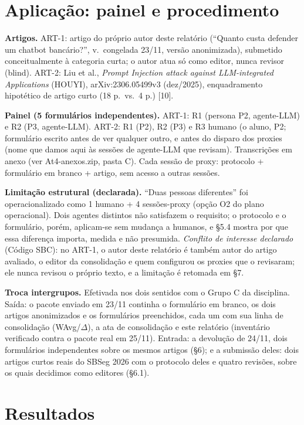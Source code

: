 \documentclass[10pt,a4paper,twocolumn]{article}
\begin{document}
\section{Aplicação: painel e procedimento}

\textbf{Artigos.} ART-1: artigo do próprio autor deste relatório (``Quanto custa defender um chatbot bancário?'', v.\ congelada 23/11, versão anonimizada), submetido conceitualmente à categoria curta; o autor atua só como editor, nunca revisor (blind). ART-2: Liu et al., \emph{Prompt Injection attack against LLM-integrated Applications} (HOUYI), arXiv:2306.05499v3 (dez/2025), enquadramento hipotético de artigo curto (18 p.\ vs.\ 4 p.) [10].

\textbf{Painel (5 formulários independentes).} ART-1: R1 (persona P2, agente-LLM) e R2 (P3, agente-LLM). ART-2: R1 (P2), R2 (P3) e R3 humano (o aluno, P2; formulário escrito antes de ver qualquer outro, e antes do disparo dos proxies (nome que damos aqui às sessões de agente-LLM que revisam). Transcrições em anexo (ver At4-anexos.zip, pasta C). Cada sessão de proxy: protocolo + formulário em branco + artigo, sem acesso a outras sessões.

\textbf{Limitação estrutural (declarada).} ``Duas pessoas diferentes'' foi operacionalizado como 1 humano + 4 sessões-proxy (opção O2 do plano operacional). Dois agentes distintos não satisfazem o requisito; o protocolo e o formulário, porém, aplicam-se sem mudança a humanos, e \S5.4 mostra por que essa diferença importa, medida e não presumida. \emph{Conflito de interesse declarado} (Código SBC): no ART-1, o autor deste relatório é também autor do artigo avaliado, o editor da consolidação e quem configurou os proxies que o revisaram; ele nunca revisou o próprio texto, e a limitação é retomada em \S7.

\textbf{Troca intergrupos.} Efetivada nos dois sentidos com o Grupo C da disciplina. Saída: o pacote enviado em 23/11 continha o formulário em branco, os dois artigos anonimizados e os formulários preenchidos, cada um com sua linha de consolidação (WAvg/$\Delta$), a ata de consolidação e este relatório (inventário verificado contra o pacote real em 25/11). Entrada: a devolução de 24/11, dois formulários independentes sobre os mesmos artigos (\S6); e a submissão deles: dois artigos curtos reais do SBSeg 2026 com o protocolo deles e quatro revisões, sobre os quais decidimos como editores (\S6.1).

\section{Resultados}
\end{document}

